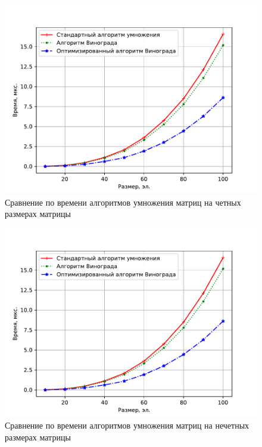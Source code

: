 \begin{figure}[H]
	\centering
	\includegraphics[height=0.4\textheight, page=1]{img/figures.pdf}
	\caption{Сравнение по времени алгоритмов умножения матриц на четных размерах матрицы}
	\label{plt:time_01}
\end{figure}


\begin{figure}[H]
	\centering
	\includegraphics[height=0.4\textheight, page=2]{img/figures.pdf}
	\caption{Сравнение по времени алгоритмов умножения матриц на нечетных размерах матрицы}
	\label{plt:time_02}
\end{figure}

\clearpage

